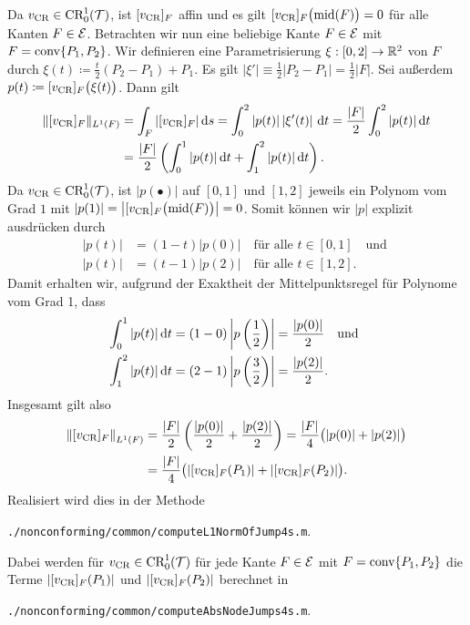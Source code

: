 Da $v_\textup{CR}\in\textup{CR}^1_0(\mathcal{T})$, ist $[v_\textup{CR}]_F$ affin und es gilt
$[v_\textup{CR}]_F\big(\textup{mid}(F)\big)=0$ für alle Kanten $F\in\mathcal{E}$.
Betrachten wir nun eine beliebige Kante $F\in\mathcal{E}$ mit $F=\textup{conv}\{P_1,P_2\}$. 
Wir definieren eine Parametrisierung $\xi:[0,2]\to\mathbb{R}^2$ von $F$ durch
$\xi(t)\coloneqq \frac{t}{2}(P_2-P_1)+P_1$. 
Es gilt $\left|\xi'\right|\equiv \frac{1}{2}|P_2-P_1|=\frac{1}{2}|F|$.
Sei außerdem
$p(t)\coloneqq [v_\textup{CR}]_F\big(\xi(t)\big)$. Dann gilt
\begin{align*}
  \Vert [v_\textup{CR}]_F\Vert_{L^1(F)} 
  &=
  \int_F |[v_\textup{CR}]_F|\,\mathrm{d}s 
  = \int_0^2 |p(t)|\left|\xi'(t)\right|\,\mathrm{d}t
  = \frac{|F|}{2}\int_0^2 |p(t)|\,\mathrm{d}t\\
  &= \frac{|F|}{2}\left(\int_0^1 |p(t)|\,\mathrm{d}t + \int_1^2 |p(t)|\,\mathrm{d}t\right).
\end{align*}
Da $v_\textup{CR}\in\textup{CR}^1_0(\mathcal{T})$, ist $|p(\bullet)|$ auf $[0,1]$ und $[1,2]$ jeweils
ein Polynom vom Grad $1$ mit $|p(1)|=\left|[v_\textup{CR}]_F\big(\textup{mid}(F)\big)\right|=0$. 
Somit können wir $|p|$ explizit ausdrücken durch
\begin{align*}
  |p(t)|&=(1-t)|p(0)| \quad\text{für alle }t\in[0,1] \quad\text{und }\\
  |p(t)|&=(t-1)|p(2)| \quad\text{für alle }t\in[1,2].
\end{align*}
Damit erhalten wir, aufgrund der Exaktheit der Mittelpunktsregel für Polynome
vom Grad 1, dass
\begin{align*}
  \int_0^1 |p(t)|\,\mathrm{d}t 
  &= 
  (1-0)\left|p\left( \frac{1}{2} \right)\right|
  =
  \frac{|p(0)|}{2}\quad\text{und }\\
  \int_1^2 |p(t)|\,\mathrm{d}t 
  &= 
  (2-1)\left|p\left( \frac{3}{2} \right)\right|
  =
  \frac{|p(2)|}{2}.
\end{align*}
Insgesamt gilt also
\begin{align*}
  \left\Vert [v_\textup{CR}]_F\right\Vert_{L^1(F)} 
  &=
  \frac{|F|}{2}\left(\frac{|p(0)|}{2} + \frac{|p(2)|}{2}\right)
  =
  \frac{|F|}{4}\big(|p(0)|+|p(2)|\big)\\
  &= 
  \frac{|F|}{4}\big(|[v_\textup{CR}]_F(P_1)|+|[v_\textup{CR}]_F(P_2)|\big).
\end{align*}
Realisiert wird dies in der Methode
\begin{center}
  \texttt{./nonconforming/common/computeL1NormOfJump4s.m}.
\end{center}
Dabei werden für $v_\textup{CR}\in\textup{CR}^1_0(\mathcal{T})$ für jede Kante $F\in\mathcal{E}$ mit
$F=\textup{conv}\{P_1,P_2\}$ die Terme $|[v_\textup{CR}]_F(P_1)|$ und $|[v_\textup{CR}]_F(P_2)|$
berechnet in
\begin{center}
  \texttt{./nonconforming/common/computeAbsNodeJumps4s.m}.
\end{center}
